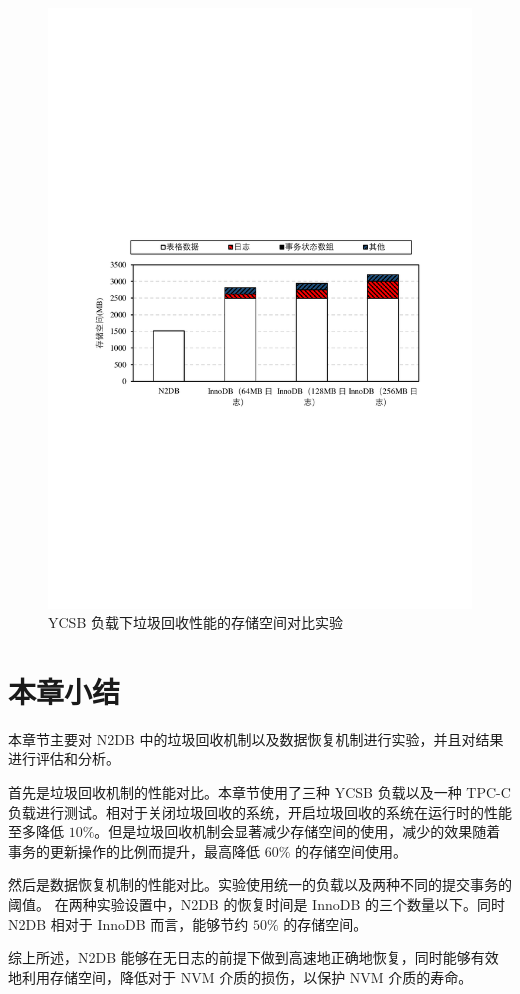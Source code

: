 \begin{figure}
    \centering
    \includegraphics[width=15cm, trim={1cm 9cm 1cm 10cm}]{figures/recovery-storage.pdf}
    \caption{YCSB 负载下垃圾回收性能的存储空间对比实验}
    \label{fig:recovery-storage-ycsb}
\end{figure}



\section{本章小结}

本章节主要对 N2DB 中的垃圾回收机制以及数据恢复机制进行实验，并且对结果进行评估和分析。

首先是垃圾回收机制的性能对比。本章节使用了三种 YCSB 负载以及一种 TPC-C 负载进行测试。相对于关闭垃圾回收的系统，开启垃圾回收的系统在运行时的性能至多降低 $10\%$。但是垃圾回收机制会显著减少存储空间的使用，减少的效果随着事务的更新操作的比例而提升，最高降低 $60\%$ 的存储空间使用。

然后是数据恢复机制的性能对比。实验使用统一的负载以及两种不同的提交事务的阈值。
在两种实验设置中，N2DB 的恢复时间是 InnoDB 的三个数量以下。同时 N2DB 相对于 InnoDB 而言，能够节约 $50\%$ 的存储空间。

综上所述，N2DB 能够在无日志的前提下做到高速地正确地恢复，同时能够有效地利用存储空间，降低对于 NVM 介质的损伤，以保护 NVM 介质的寿命。

